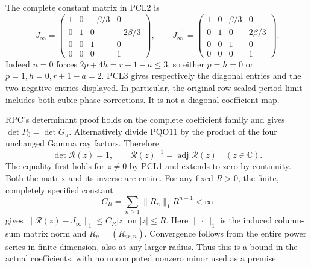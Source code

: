 \documentclass[11pt,a4paper]{article}
\begin{document}
The complete constant matrix in PCL2 is
\[
 J_\infty=
 \begin{pmatrix}
 1&0&-\beta/3&0\\
 0&1&0&-2\beta/3\\
 0&0&1&0\\
 0&0&0&1
 \end{pmatrix},\qquad
 J_\infty^{-1}=
 \begin{pmatrix}
 1&0&\beta/3&0\\
 0&1&0&2\beta/3\\
 0&0&1&0\\
 0&0&0&1
 \end{pmatrix}.
 \tag{PCL4}
\]
Indeed $n=0$ forces $2p+4h=r+1-a\le3$, so either $p=h=0$
or $p=1,h=0,r+1-a=2$. PCL3 gives respectively the diagonal
entries and the two negative entries displayed. In particular,
the original row-scaled period limit includes both cubic-phase
corrections. It is not a diagonal coefficient map.

RPC's determinant proof holds on the complete coefficient family
and gives $\det P_0=\det G_u$. Alternatively divide PQO11 by
the product of the four unchanged Gamma ray factors. Therefore
\[
       \det\mathcal R(z)=1,\qquad
       \mathcal R(z)^{-1}=\operatorname{adj}\mathcal R(z)
                       \quad(z\in\mathbb C).
 \tag{PCL5}
\]
The equality first holds for $z\ne0$ by PCL1 and extends to zero
by continuity. Both the matrix and its inverse are entire. For
any fixed $R>0$, the finite, completely specified constant
\[
 C_R=\sum_{n\ge1}\|R_n\|_1 R^{n-1}<\infty
 \tag{PCL6}
\]
gives $\|\mathcal R(z)-J_\infty\|_1\le C_R|z|$ on $|z|\le R$.
Here $\|\cdot\|_1$ is the induced column-sum matrix norm and
$R_n=(R_{a r,n})$. Convergence follows from the entire power
series in finite dimension, also at any larger radius. Thus
this is a bound in the actual coefficients, with no uncomputed
nonzero minor used as a premise.
\end{document}
